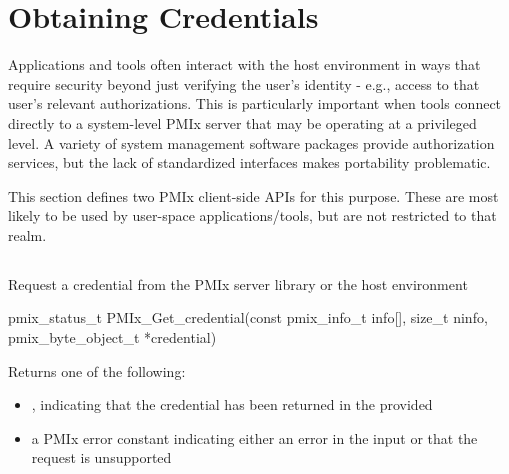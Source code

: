 \section{Obtaining Credentials}
\label{chap:api_security:obtain}

Applications and tools often interact with the host environment in ways that require security beyond just verifying the user's identity - e.g., access to that user's relevant authorizations. This is particularly important when tools connect directly to a system-level \ac{PMIx} server that may be operating at a privileged level. A variety of system management software packages provide authorization services, but the lack of standardized interfaces makes portability problematic.

This section defines two \ac{PMIx} client-side \acp{API} for this purpose. These are most likely to be used by user-space applications/tools, but are not restricted to that realm.

\subsection{}

\summary

Request a credential from the \ac{PMIx} server library or the host environment

\format

\cspecificstart
\begin{codepar}
pmix_status_t
PMIx_Get_credential(const pmix_info_t info[], size_t ninfo,
                    pmix_byte_object_t *credential)
\end{codepar}
\cspecificend

\begin{arglist}
\end{arglist}

Returns one of the following:

\begin{itemize}
    \item {}, indicating that the credential has been returned in the provided 
    \item a \ac{PMIx} error constant indicating either an error in the input or that the request is unsupported
\end{itemize}

